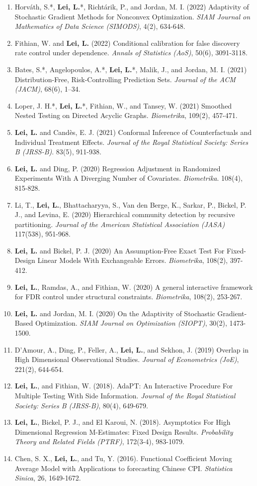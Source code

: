 \documentclass{article}
\begin{document}
\begin{enumerate}
\item Horv\'{a}th, S.*, \textbf{Lei, L.}*, Richt\'{a}rik, P., and Jordan, M. I. (2022) Adaptivity of Stochastic Gradient Methods for Nonconvex Optimization. \emph{SIAM Journal on Mathematics of Data Science (SIMODS)}, 4(2), 634-648.
\item Fithian, W. and \textbf{Lei, L.} (2022) Conditional calibration for false discovery rate control under dependence. \emph{Annals of Statistics (AoS)}, 50(6), 3091-3118.
\item Bates, S.*, Angelopoulos, A.*, \textbf{Lei, L.}*, Malik, J., and Jordan, M. I. (2021) Distribution-Free, Risk-Controlling Prediction Sets. \emph{Journal of the ACM (JACM)}, 68(6), 1–34.
\item Loper, J. H.*, \textbf{Lei, L.}*, Fithian, W., and Tansey, W. (2021) Smoothed Nested Testing on Directed Acyclic Graphs. \emph{Biometrika}, 109(2), 457-471.
\item \textbf{Lei, L.} and Cand\`{e}s, E. J. (2021) Conformal Inference of Counterfactuals and Individual Treatment Effects. \emph{Journal of the Royal Statistical Society: Series B (JRSS-B)}. 83(5), 911-938.
\item \textbf{Lei, L.} and Ding, P. (2020) Regression Adjustment in Randomized Experiments With A Diverging Number of Covariates. \emph{Biometrika}. 108(4), 815-828.
\item Li, T., \textbf{Lei, L.}, Bhattacharyya, S., Van den Berge, K., Sarkar, P., Bickel, P. J., and Levina, E. (2020) Hierarchical community detection by recursive partitioning. \emph{Journal of the American Statistical Association (JASA)} 117(538), 951-968.
\item \textbf{Lei, L.} and Bickel, P. J. (2020) An Assumption-Free Exact Test For Fixed-Design Linear Models With Exchangeable Errors. \emph{Biometrika}, 108(2), 397-412.
\item \textbf{Lei, L.}, Ramdas, A., and Fithian, W. (2020) A general interactive framework for FDR control under structural constraints. \emph{Biometrika}, 108(2), 253-267.
\item \textbf{Lei, L.} and Jordan, M. I. (2020) On the Adaptivity of Stochastic Gradient-Based Optimization. \emph{SIAM Journal on Optimization (SIOPT)}, 30(2), 1473-1500.
\item D'Amour, A., Ding, P., Feller, A., \textbf{Lei, L.}, and Sekhon, J. (2019) Overlap in High Dimensional Observational Studies. \emph{Journal of Econometrics (JoE)}, 221(2), 644-654.
\item \textbf{Lei, L.}, and Fithian, W. (2018). AdaPT: An Interactive Procedure For Multiple Testing With Side Information. \emph{Journal of the Royal Statistical Society: Series B (JRSS-B)}, 80(4), 649-679.
\item \textbf{Lei, L.}, Bickel, P. J., and El Karoui, N. (2018). Asymptotics For High Dimensional Regression M-Estimates: Fixed Design Results. \emph{Probability Theory and Related Fields (PTRF)}, 172(3-4), 983-1079.
\item Chen, S. X., \textbf{Lei, L.}, and Tu, Y. (2016). Functional Coefficient Moving Average Model with Applications to forecasting Chinese CPI. \emph{Statistica Sinica}, 26, 1649-1672.
\end{enumerate}
\end{document}
